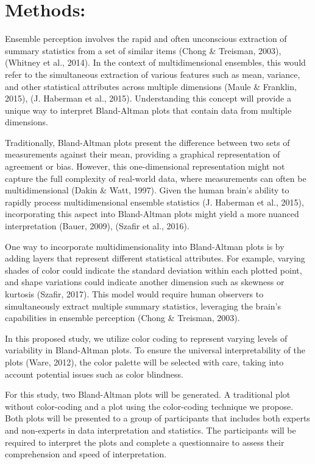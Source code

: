 \documentclass[print]{nuthesis}
\begin{document}
\hypertarget{methods}{%
\section{Methods:}\label{methods}}

Ensemble perception involves the rapid and often unconscious extraction of summary statistics from a set of similar items (Chong \& Treisman, 2003), (Whitney et al., 2014).
In the context of multidimensional ensembles, this would refer to the simultaneous extraction of various features such as mean, variance, and other statistical attributes across multiple dimensions (Maule \& Franklin, 2015), (J. Haberman et al., 2015).
Understanding this concept will provide a unique way to interpret Bland-Altman plots that contain data from multiple dimensions.

Traditionally, Bland-Altman plots present the difference between two sets of measurements against their mean, providing a graphical representation of agreement or bias.
However, this one-dimensional representation might not capture the full complexity of real-world data, where measurements can often be multidimensional (Dakin \& Watt, 1997).
Given the human brain's ability to rapidly process multidimensional ensemble statistics (J. Haberman et al., 2015), incorporating this aspect into Bland-Altman plots might yield a more nuanced interpretation (Bauer, 2009), (Szafir et al., 2016).

One way to incorporate multidimensionality into Bland-Altman plots is by adding layers that represent different statistical attributes.
For example, varying shades of color could indicate the standard deviation within each plotted point, and shape variations could indicate another dimension such as skewness or kurtosis (Szafir, 2017).
This model would require human observers to simultaneously extract multiple summary statistics, leveraging the brain's capabilities in ensemble perception (Chong \& Treisman, 2003).

In this proposed study, we utilize color coding to represent varying levels of variability in Bland-Altman plots.
To ensure the universal interpretability of the plots (Ware, 2012), the color palette will be selected with care, taking into account potential issues such as color blindness.

For this study, two Bland-Altman plots will be generated.
A traditional plot without color-coding and a plot using the color-coding technique we propose.
Both plots will be presented to a group of participants that includes both experts and non-experts in data interpretation and statistics.
The participants will be required to interpret the plots and complete a questionnaire to assess their comprehension and speed of interpretation.
\end{document}
